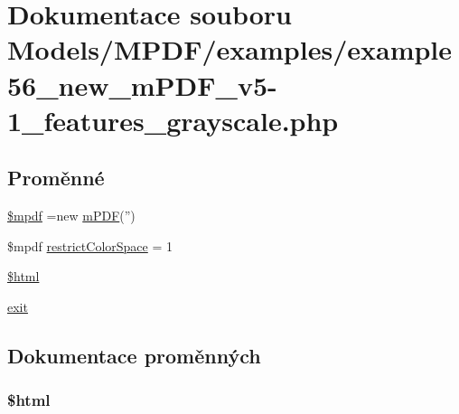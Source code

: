 \hypertarget{example56__new__m_p_d_f__v5-1__features__grayscale_8php}{\section{Dokumentace souboru Models/\-M\-P\-D\-F/examples/example56\-\_\-new\-\_\-m\-P\-D\-F\-\_\-v5-\/1\-\_\-features\-\_\-grayscale.php}
\label{example56__new__m_p_d_f__v5-1__features__grayscale_8php}
}
\subsection*{Proměnné}
\begin{DoxyCompactItemize}
\item 
\hyperlink{example56__new__m_p_d_f__v5-1__features__grayscale_8php_ad028f81910d6cbab9b184d2214b3a8f8}{\$mpdf} =new \hyperlink{classm_p_d_f}{m\-P\-D\-F}('')
\item 
\$mpdf \hyperlink{example56__new__m_p_d_f__v5-1__features__grayscale_8php_ace17057950eda2558dd7cc2c539d2df4}{restrict\-Color\-Space} = 1
\item 
\hyperlink{example56__new__m_p_d_f__v5-1__features__grayscale_8php_a6f96e7fc92441776c9d1cd3386663b40}{\$html}
\item 
\hyperlink{example56__new__m_p_d_f__v5-1__features__grayscale_8php_a6733eb5f605d09eaede9845835d71c4e}{exit}
\end{DoxyCompactItemize}


\subsection{Dokumentace proměnných}
\hypertarget{example56__new__m_p_d_f__v5-1__features__grayscale_8php_a6f96e7fc92441776c9d1cd3386663b40}{
\subsubsection[{\$html}]{\setlength{\rightskip}{0pt plus 5cm}\$html}}\label{example56__new__m_p_d_f__v5-1__features__grayscale_8php_a6f96e7fc92441776c9d1cd3386663b40}


